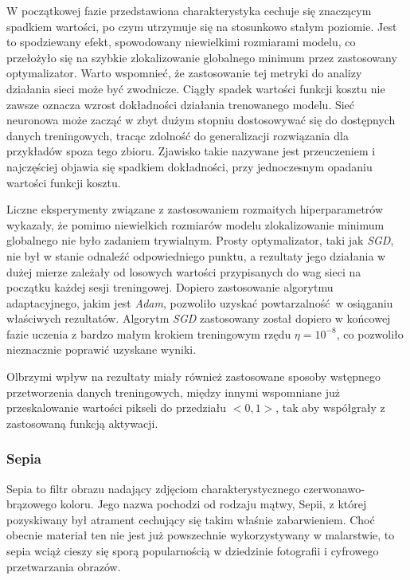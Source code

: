     W początkowej fazie przedstawiona charakterystyka cechuje się znaczącym spadkiem
    wartości, po czym utrzymuje się na stosunkowo stałym poziomie. Jest to spodziewany
    efekt, spowodowany niewielkimi rozmiarami modelu, co przełożyło się na szybkie
    zlokalizowanie globalnego minimum przez zastosowany optymalizator. Warto wspomnieć,
    że zastosowanie tej metryki do analizy działania sieci może być zwodnicze.
    Ciągły spadek wartości funkcji kosztu nie zawsze oznacza wzrost dokładności działania
    trenowanego modelu. Sieć neuronowa może zacząć w zbyt dużym stopniu dostosowywać się
    do dostępnych danych treningowych, tracąc zdolność do generalizacji rozwiązania dla
    przykładów spoza tego zbioru. Zjawisko takie nazywane jest przeuczeniem i najczęściej
    objawia się spadkiem dokładności, przy jednoczesnym opadaniu wartości funkcji kosztu.

    Liczne eksperymenty związane z zastosowaniem rozmaitych hiperparametrów wykazały, że
    pomimo niewielkich rozmiarów modelu zlokalizowanie minimum globalnego nie było
    zadaniem trywialnym. Prosty optymalizator, taki jak \textit{SGD}, nie był w stanie odnaleźć
    odpowiedniego punktu, a rezultaty jego działania w dużej mierze zależały od
    losowych wartości przypisanych do wag sieci na początku każdej sesji treningowej.
    Dopiero zastosowanie algorytmu adaptacyjnego, jakim jest \textit{Adam}, pozwoliło
    uzyskać powtarzalność w osiąganiu właściwych rezultatów. Algorytm \textit{SGD}
    zastosowany został dopiero w końcowej fazie uczenia z bardzo małym krokiem
    treningowym rzędu $\eta = 10^{-8}$, co pozwoliło nieznacznie poprawić uzyskane
    wyniki.

    Olbrzymi wpływ na rezultaty miały również zastosowane sposoby wstępnego przetworzenia danych
    treningowych, między innymi wspomniane już przeskalowanie wartości pikseli
    do przedziału $<0,1>$, tak aby współgrały z zastosowaną funkcją aktywacji.

  \subsubsection{Sepia}

    Sepia to filtr obrazu nadający zdjęciom charakterystycznego czerwonawo-brązowego
    koloru. Jego nazwa pochodzi od rodzaju mątwy, Sepii, z której pozyskiwany
    był atrament cechujący się takim właśnie zabarwieniem. Choć obecnie materiał ten
    nie jest już powszechnie wykorzystywany w malarstwie, to sepia wciąż cieszy się
    sporą popularnością w dziedzinie fotografii i cyfrowego przetwarzania obrazów.

